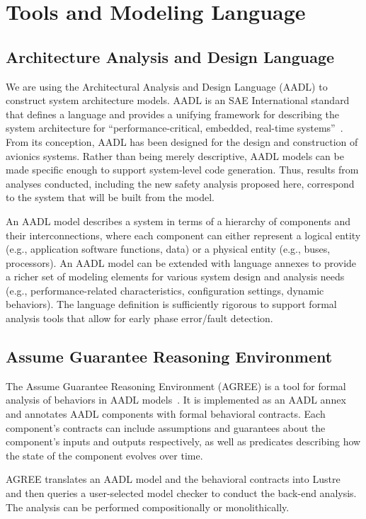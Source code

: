 \section{Tools and Modeling Language}

\subsection{Architecture Analysis and Design Language}
We are using the Architectural Analysis and Design Language (AADL) to construct system architecture models.  AADL is an SAE International standard that defines a language and provides a unifying framework for describing the system architecture for ``performance-critical, embedded, real-time systems''~\cite{AADL_Standard,FeilerModelBasedEngineering2012}. From its conception, AADL has been designed for the design and construction of avionics systems.  Rather than being merely descriptive, AADL models can be made specific enough to support system-level code generation.  Thus, results from analyses conducted, including the new safety analysis proposed here, correspond to the system that will be built from the model.  

An AADL model describes a system in terms of a hierarchy of components and their interconnections, where each component can either represent a logical entity (e.g., application software functions, data) or a physical entity (e.g., buses, processors). An AADL model can be extended with language annexes to provide a richer set of modeling elements for various system design and analysis needs (e.g., performance-related characteristics, configuration settings, dynamic behaviors). The language definition is sufficiently rigorous to support formal analysis tools that allow for early phase error/fault detection.

\subsection{Assume Guarantee Reasoning Environment}
The Assume Guarantee Reasoning Environment (AGREE) is a tool for formal analysis of behaviors in AADL models~\cite{NFM2012:CoGaMiWhLaLu}.  It is implemented as an AADL annex and annotates AADL components with formal behavioral contracts. Each component's contracts can include assumptions and guarantees about the component's inputs and outputs respectively, as well as predicates describing how the state of the component evolves over time.

AGREE translates an AADL model and the behavioral contracts into Lustre~\cite{Halbwachs91:IEEE} and then queries a user-selected model checker to conduct the back-end analysis. The analysis can be performed compositionally or monolithically.

